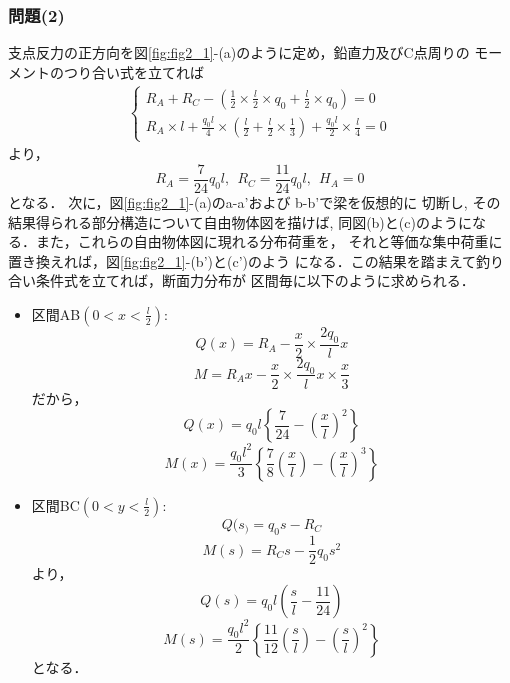 \documentclass[10pt,a4j]{jarticle}
\begin{document}
\subsubsection*{問題(2)}
支点反力の正方向を図\ref{fig:fig2_1}-(a)のように定め，鉛直力及びC点周りの
モーメントのつり合い式を立てれば
\begin{eqnarray}
	\left\{
	\begin{array}{ll}
		R_A+R_C-\left(
			\frac{1}{2}\times \frac{l}{2}\times q_0 + \frac{l}{2}\times q_0
			\right)
			=0
		\\
		R_A\times l 
		+\frac{q_0l}{4}\times \left(\frac{l}{2}+\frac{l}{2}\times \frac{1}{3}\right)
		+\frac{q_0l}{2}\times \frac{l}{4}
		=0
	\end{array}
	\right.
\end{eqnarray}
より，
\begin{equation}
	R_A=\frac{7}{24}q_0l, \ \ R_C=\frac{11}{24}q_0l, \ \ H_A=0
\end{equation}
となる．
次に，図\ref{fig:fig2_1}-(a)のa-a'および b-b'で梁を仮想的に
切断し, その結果得られる部分構造について自由物体図を描けば, 
同図(b)と(c)のようになる．また，これらの自由物体図に現れる分布荷重を，
それと等価な集中荷重に置き換えれば，図\ref{fig:fig2_1}-(b')と(c')のよう
になる．この結果を踏まえて釣り合い条件式を立てれば，断面力分布が
区間毎に以下のように求められる．
\begin{itemize}
\item
	区間AB$\left( 0<x<\frac{l}{2}\right)$:\\
	\begin{equation}
		Q(x)=R_A-\frac{x}{2}\times \frac{2q_0}{l}x 
	\end{equation}
	\begin{equation}
		M=R_Ax-
		\frac{x}{2}\times
		\frac{2q_0}{l}x \times\frac{x}{3}
	\end{equation}
	だから，
	\begin{equation}
		Q(x) =
		q_0l \left\{ 
			\frac{7}{24} -\left( \frac{x}{l} \right)^2
		\right\}
	\end{equation}
	\begin{equation}
		M(x) =
		\frac{q_0l^2}{3} \left\{ 
			\frac{7}{8}\left(\frac{x}{l}\right) - \left( \frac{x}{l} \right)^3
		\right\}
	\end{equation}
\item
	区間BC$\left( 0<y<\frac{l}{2}\right)$:\\
	\begin{equation}
		Q(s_)=q_0s-R_C
	\end{equation}
	\begin{equation}
		M(s)=R_Cs -\frac{1}{2}q_0s^2 
	\end{equation}
	より，
	\begin{equation}
		Q(s) =q_0l\left( \frac{s}{l}-\frac{11}{24}\right)
	\end{equation}
	\begin{equation}
		M(s) =\frac{q_0l^2}{2} 
		\left\{ \frac{11}{12}\left(\frac{s}{l}\right)-\left(\frac{s}{l}\right)^2 \right\}
	\end{equation}
	となる．
\end{itemize}
\end{document}
